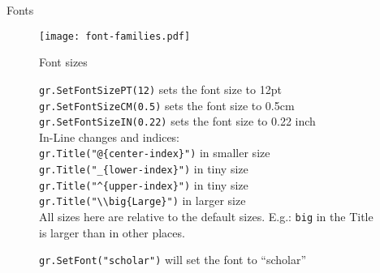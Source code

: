 \documentclass[a4paper]{article}
\newcommand{\cd}{\texttt}
\newcommand{\dbs}{\textbackslash\textbackslash}
\begin{document}
\begin{center}
  Fonts
\end{center}

\begin{figure}[h]
  \begin{minipage}{7cm}
     \texttt{[image: font-families.pdf]}
     \caption{\cd{gr.SetFont("scholar")} will set the font to ``scholar''}
  \end{minipage}
    \hfill
  \begin{minipage}{9cm}
  \begin{center}Font sizes\end{center}
    \cd{gr.SetFontSizePT(12)} sets the font size to 12pt \\
    \cd{gr.SetFontSizeCM(0.5)} sets the font size to 0.5cm \\
    \cd{gr.SetFontSizeIN(0.22)} sets the font size to 0.22 inch \\
    In-Line changes and indices: \\
    \cd{gr.Title("@\{center-index\}")} in smaller size \\
    \cd{gr.Title("\_\{lower-index\}")} in tiny size \\
    \cd{gr.Title("\^{}\{upper-index\}")} in tiny size \\
    \cd{gr.Title("\dbs big\{Large\}")} in larger size \\
    All sizes here are relative to the default sizes. 
    E.g.: \cd{big} in the Title is larger than in other places. \\ 
  \end{minipage}
\end{figure}
\end{document}
